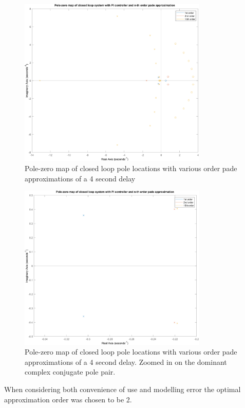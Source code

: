 \begin{figure}[h!]
	\centering
	\includegraphics[width=0.8\textwidth]{Pictures/PZmap_CL.png}
	\caption{Pole-zero map of closed loop pole locations with various order pade approximations of a 4 second delay}
	\label{fig:CLPoles}
\end{figure}
\begin{figure}[h!]
	\centering
	\includegraphics[width=0.8\textwidth]{Pictures/PZmap_CL_zoom.png}
	\caption{Pole-zero map of closed loop pole locations with various order pade approximations of a 4 second delay. Zoomed in on the dominant complex conjugate pole pair.}
	\label{fig:CLPolesZoom}
\end{figure}
When considering both convenience of use and modelling error the optimal approximation order was chosen to be 2.


